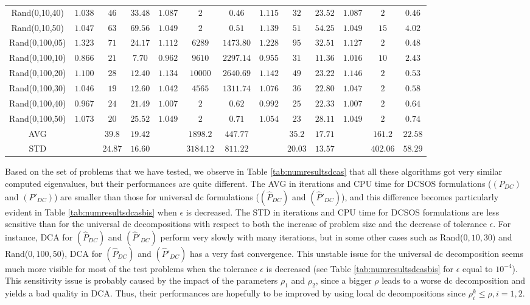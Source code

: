 \documentclass[3p]{elsarticle}
\begin{document}
\begin{table}[h!]
\begin{center}
{\begin{tabular}{c|ccc|ccc|ccc|ccc}
				Rand(0,10,40) & $1.038$ & $46$ & $33.48$ &$1.087$ & $2$ & $0.46$ &$1.115$ & $32$ & $23.52$ &$1.087$ & $2$ & $0.46$ \\
				Rand(0,10,50) & $1.047$ & $63$ & $69.56$ &$1.049$ & $2$ & $0.51$ &$1.139$ & $51$ & $54.25$ &$1.049$ & $15$ & $4.02$ \\
				\hline
				Rand(0,100,05) & $1.323$ & $71$ & $24.17$ &$1.112$ & $6289$ & $1473.80$ &$1.228$ & $95$ & $32.51$ &$1.127$ & $2$ & $0.48$ \\
				Rand(0,100,10) & $0.866$ & $21$ & $7.70$ &$0.962$ & $9610$ & $2297.14$ &$0.955$ & $31$ & $11.36$ &$1.016$ & $10$ & $2.43$ \\
				Rand(0,100,20) & $1.100$ & $28$ & $12.40$ &$1.134$ & $10000$ & $2640.69$ &$1.142$ & $49$ & $23.22$ &$1.146$ & $2$ & $0.53$ \\
				Rand(0,100,30) & $1.046$ & $19$ & $12.60$ &$1.042$ & $4565$ & $1311.74$ &$1.076$ & $36$ & $22.80$ &$1.047$ & $2$ & $0.58$ \\
				Rand(0,100,40) & $0.967$ & $24$ & $21.49$ &$1.007$ & $2$ & $0.62$ &$0.992$ & $25$ & $22.33$ &$1.007$ & $2$ & $0.64$ \\
				Rand(0,100,50) & $1.073$ & $20$ & $25.52$ &$1.049$ & $2$ & $0.71$ &$1.054$ & $23$ & $28.11$ &$1.049$ & $2$ & $0.74$ \\
				\hline 
				AVG &&	$39.8$ & $19.42$ && $1898.2$ & $447.77$ && $35.2$ & $17.71$ && $161.2$ & $22.58$\\			 
				STD	&& $24.87$ & $16.60$ && $3184.12$ & $811.22$ && $20.03$ & $13.57$ && $402.06$ & $58.29$\\
				\hline 
			\end{tabular} 
		}
	\end{center}
\end{table}
Based on the set of problems that we have tested, we observe in Table \ref{tab:numresultsdcas} that all these algorithms got very similar computed eigenvalues, but their performances are quite different. The AVG in iterations and CPU time for DCSOS formulations ($(P_{DC})$ and $(P'_{DC})$) are smaller than those for universal dc formulations ($(\hat{P}_{DC})$ and $(\hat{P}'_{DC})$), and this difference becomes particularly evident in Table \ref{tab:numresultsdcasbis} when $\epsilon$ is decreased. The STD in iterations and CPU time for DCSOS formulations are less sensitive than for the universal dc decompositions with respect to both the increase of problem size and the decrease of tolerance $\epsilon$. For instance, DCA for $(\hat{P}_{DC})$ and $(\hat{P}'_{DC})$ perform very slowly with many iterations, but in some other cases such as Rand($0,10,30$) and Rand($0,100,50$), DCA for $(\hat{P}_{DC})$ and $(\hat{P}'_{DC})$ has a very fast convergence. This unstable issue for the universal dc decomposition seems much more visible for most of the test problems when the tolerance $\epsilon$ is decreased (see Table \ref{tab:numresultsdcasbis} for $\epsilon$ equal to $10^{-4}$). This sensitivity issue is probably caused by the impact of the parameters $\rho_1$ and $\rho_2$, since a bigger $\rho$ leads to a worse dc decomposition and yields a bad quality in DCA. Thus, their performances are hopefully to be improved by using local dc decompositions since $\rho_i^k\leq \rho, i=1,2$. 
\end{document}
